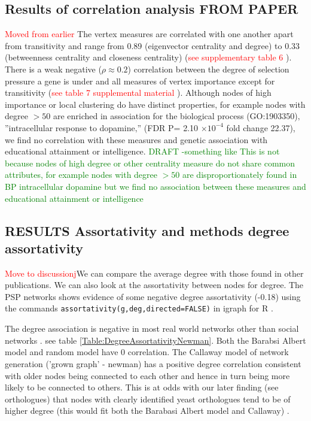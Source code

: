  



\subsection{Results of correlation analysis FROM PAPER}
\textcolor{red}{Moved from earlier}
The vertex measures are correlated with one another apart from transitivity and range from 0.89 (eigenvector centrality and degree) to 0.33 (betweenness centrality and closeness centrality) (\textcolor{red}{see supplementary table 6} ).
There is a weak negative ($\rho \approx 0.2$) correlation between 
the degree of selection pressure a gene is under and all measures of vertex importance except for transitivity (\textcolor{red}{see table 7 supplemental material} ).
Although nodes of high importance or local clustering do have distinct properties, for example nodes with degree $> 50$ are enriched in association for the biological process (GO:1903350)‚ ”intracellular response to dopamine‚” (FDR P= 2.10 $\times 10^{-4}$ fold change 22.37), we find no correlation with these measures and genetic association with educational attainment or intelligence. 
\textcolor{green}{DRAFT -something like This is not because nodes of high degree or other centrality measure do not share common attributes, for example nodes with degree $>50$ are disproportionately found in BP intracellular dopamine but we find no association between these measures and educational attainment or intelligence}





\subsection{RESULTS Assortativity and methods degree assortativity}
\textcolor{red}{Move to discussionj}We can compare the average degree with those found in other publications. We can also look at the assortativity between nodes for degree. The PSP networks shows evidence of some negative degree assortativity (-0.18) using the commands \texttt{assortativity(g,deg,directed=FALSE)} in igraph for R .

The degree association is negative in most real world networks other than social networks \cite{newman2002assortative}.  see table \ref{Table:DegreeAssortativityNewman}. Both the Barabsi Albert model and random model have 0 correlation. The Callaway model of network generation ('grown graph' - newman) has a positive degree correlation consistent with older nodes being connected to each other and hence in turn being more likely to be connected to others. This is at odds with our later finding (see orthologues) that nodes with clearly identified yeast orthologues tend to be of higher degree (this would fit both the Barabasi Albert model and Callaway) . 

